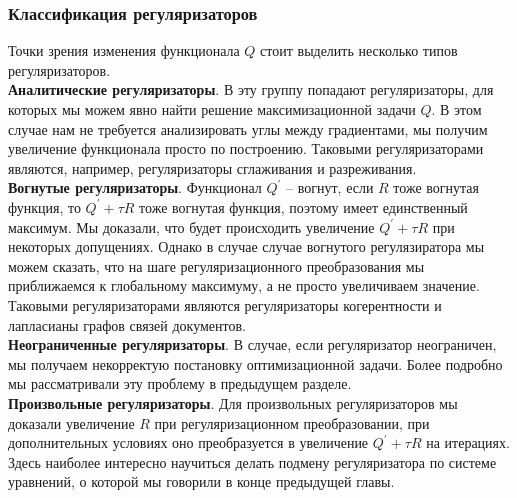 \documentclass[12pt]{article}
\begin{document}
           \subsubsection{Классификация регуляризаторов}
Точки зрения изменения функционала $Q$ стоит выделить несколько типов регуляризаторов.\\
	 \textbf{Аналитические регуляризаторы}. В эту группу попадают регуляризаторы, для которых мы можем явно найти решение максимизационной задачи $Q$. В этом случае нам не требуется анализировать углы между градиентами, мы получим увеличение функционала просто по построению. Таковыми регуляризаторами являются, например, регуляризаторы сглаживания и разреживания.\\ 
	\textbf{Вогнутые регуляризаторы}. Функционал $Q^{\prime}$ -- вогнут, если $R$ тоже вогнутая функция, то $Q^{\prime} + \tau R$ тоже вогнутая функция, поэтому имеет единственный максимум. Мы доказали, что будет происходить увеличение $Q^{\prime} + \tau R$ при некоторых допущениях. Однако в случае случае вогнутого регулязиратора мы можем сказать, что на шаге регуляризационного преобразования мы приближаемся к глобальному максимуму, а не просто увеличиваем значение. Таковыми регуляризаторами являются регуляризаторы когерентности и лапласианы графов связей документов.\\
	\textbf{Неограниченные регуляризаторы}. В случае, если регуляризатор неограничен, мы получаем некорректую постановку оптимизационной задачи. Более подробно мы рассматривали эту проблему в предыдущем разделе.\\
	\textbf{Произвольные регуляризаторы}. Для произвольных регуляризаторов мы доказали увеличение $R$ при регуляризационном преобразовании, при дополнительных условиях оно преобразуется в увеличение $Q^{\prime} + \tau R$ на итерациях. Здесь наиболее интересно научиться делать подмену регуляризатора по системе уравнений, о которой мы говорили в конце предыдущей главы.
\end{document}
